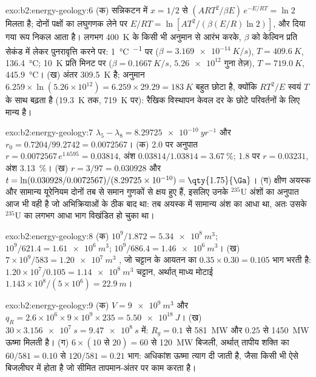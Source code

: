 \begin{solution}{exo:b2:energy-geology:6}
(क) सन्निकटन में $x = 1/2$ से $(ART^2/\beta E)\,e^{-E/RT} = \ln 2$ मिलता है; दोनों पक्षों का लघुगणक लेने पर
$E/RT = \ln[AT^2/(\beta(E/R)\ln 2)]$, और दिया गया रूप निकल आता है। लगभग \qty{400}{K} के किसी भी
अनुमान से आरंभ करके, $\beta$ को केल्विन प्रति सेकंड में लेकर पुनरावृत्ति करने पर: \qty{1}{\celsius\per\Myr}
पर ($\beta = \qty{3.169e-14}{K/s}$), $T = \qty{409.6}{K}$, \qty{136.4}{\celsius}; \qty{10}{K} प्रति
मिनट पर ($\beta = \qty{0.1667}{K/s}$, $\num{5.26e12}$ गुना तेज़), $T = \qty{719.0}{K}$,
\qty{445.9}{\celsius}। (ख) अंतर \qty{309.5}{K} है; अनुमान $6.259 \times
\ln(5.26 \times 10^{12}) = 6.259 \times 29.29 = \qty{183}{K}$ बहुत छोटा है, क्योंकि $RT^2/E$
स्वयं $T$ के साथ बढ़ता है (\qty{19.3}{K} तक, \qty{719}{K} पर): रैखिक विस्थापन केवल दर के छोटे
परिवर्तनों के लिए मान्य है।
\end{solution}

\begin{solution}{exo:b2:energy-geology:7}
$\lambda_5 - \lambda_8 = \qty{8.29725e-10}{yr^{-1}}$ और $r_0 = 0.7204/99.2742 = 0.0072567$।
(क) \qty{2.0}{\Ga} पर अनुपात $r = 0.0072567\,e^{1.6595} = 0.03814$, अंश $0.03814/1.03814 =
\qty{3.67}{\percent}$; \qty{1.8}{\Ga} पर $r = 0.03231$, अंश \qty{3.13}{\percent}। (ख) $r =
3/97 = 0.030928$ और $t = \ln(0.030928/0.0072567)/(8.29725 \times 10^{-10}) = \qty{1.75}{\Ga}$।
(ग) क्षीण अयस्क और सामान्य यूरेनियम दोनों तब से समान गुणकों से क्षय हुए हैं, इसलिए उनके $^{235}$U अंशों का
अनुपात आज भी वही है जो अभिक्रियाओं के ठीक बाद था: तब अयस्क में सामान्य अंश का आधा था, अतः उसके
$^{235}$U का लगभग आधा भाग विखंडित हो चुका था।
\end{solution}

\begin{solution}{exo:b2:energy-geology:8}
(क) $10^9/1.872 = \qty{5.34e8}{m^3}$; $10^9/621.4 = \qty{1.61e6}{m^3}$; $10^9/686.4 =
\qty{1.46e6}{m^3}$। (ख) $7 \times 10^9/583 = \qty{1.20e7}{m^3}$ , जो चट्टान के आयतन का
$0.35 \times 0.30 = 0.105$ भाग भरती है: $1.20 \times 10^7/0.105 = \qty{1.14e8}{m^3}$ चट्टान,
अर्थात् माध्य मोटाई $1.143 \times 10^8/(5 \times 10^6) = \qty{22.9}{m}$।
\end{solution}

\begin{solution}{exo:b2:energy-geology:9}
(क) $V = \qty{9e9}{m^3}$ और $q_R = 2.6 \times 10^6 \times 9 \times 10^9 \times 235 =
\qty{5.50e18}{J}$। (ख) $30 \times \qty{3.156e7}{s} = \qty{9.47e8}{s}$ में: $R_g = 0.1$ से
\qty{581}{MW} और $0.25$ से \qty{1450}{MW} ऊष्मा मिलती है। (ग) $6 \times (10 \text{ से } 20) = 60$ से
\qty{120}{MW} बिजली, अर्थात् तापीय शक्ति का $60/581 = 0.10$ से $120/581 = 0.21$ भाग: अधिकांश
ऊष्मा त्याग दी जाती है, जैसा किसी भी ऐसे बिजलीघर में होता है जो सीमित तापमान-अंतर पर काम करता है।
\end{solution}

